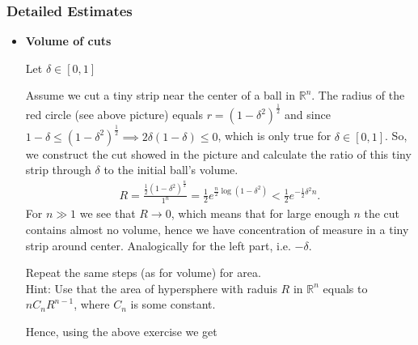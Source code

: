 \subsubsection{Detailed Estimates}
\begin{itemize}
\item {\bf Volume of cuts}
\par Let $\delta \in [0, 1]$
\begin{center}
\end{center}
Assume we cut a tiny strip near the center of a ball in $\mathbb{R}^n$. The radius of the red circle (see above picture) equals $r = (1-\delta^2)^{\frac 1 2}$ and since $1 - \delta \le (1-\delta^2)^{\frac 1 2} \implies 2\delta(1-\delta) \le 0$, which is only true for $\delta \in [0,1]$. So, we construct the cut showed in the picture and calculate the ratio of this tiny strip through $\delta$ to the initial ball's volume. 
\begin{eqnarray}
R = \frac {\frac 1 2 (1-\delta^2)^{\frac n 2}}{1^n} = \frac 1 2 e^{\frac n 2 \log(1-\delta^2)} < \frac 1 2 e^{- \frac 1 2 \delta^2 n}.
\end{eqnarray}
For $n \gg 1$ we see that $R \to 0$, which means that for large enough $n$ the cut contains almost no volume, hence we have concentration of measure in a tiny strip around center. Analogically for the left part, i.e. $- \delta$.
\begin{exer}
Repeat the same steps (as for volume) for area. 
\\
Hint: Use that the area of hypersphere with raduis $R$ in $\mathbb{R}^n$ equals to $n C_n R^{n-1}$, where $C_n$ is some constant. 
\end{exer}
Hence, using the above exercise we get
\begin{eqnarray}

\end{eqnarray}
\end{itemize}
